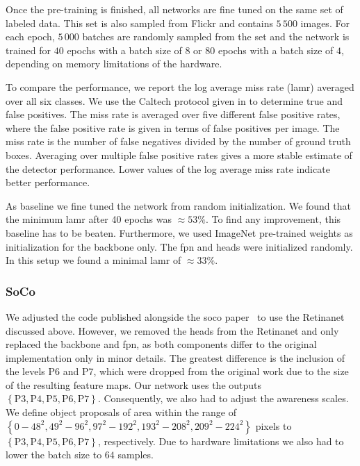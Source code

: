 Once the pre-training is finished, all networks are fine tuned on the same set of labeled data. This set is also sampled from Flickr and contains $5\,500$ images. For each epoch, $5\,000$ batches are randomly sampled from the set and the network is trained for $40$ epochs with a batch size of $8$ or $80$ epochs with a batch size of $4$, depending on memory limitations of the hardware.

To compare the performance, we report the log average miss rate (\acrshort{lamr}) averaged over all six classes. We use the Caltech protocol given in \cite{Dollar:2012aaa} to determine true and false positives. The miss rate is averaged over five different false positive rates, where the false positive rate is given in terms of false positives per image. The miss rate is the number of false negatives divided by the number of ground truth boxes. Averaging over multiple false positive rates gives a more stable estimate of the detector performance. Lower values of the log average miss rate indicate better performance.

As baseline we fine tuned the network from random initialization. We found that the minimum \acrshort{lamr} after 40 epochs was $\approx 53\%$. To find any improvement, this baseline has to be beaten. Furthermore, we used ImageNet pre-trained weights as initialization for the backbone only. The \acrshort{fpn} and heads were initialized randomly. In this setup we found a minimal \acrshort{lamr} of $\approx 33\%$.

\subsubsection{SoCo}
We adjusted the code published alongside the \acrshort{soco} paper~\cite{Wei:2022aaa} to use the Retinanet discussed above. However, we removed the heads from the Retinanet and only replaced the backbone and \acrshort{fpn}, as both components differ to the original implementation only in minor details. The greatest difference is the inclusion of the levels P6 and P7, which were dropped from the original work due to the size of the resulting feature maps. Our network uses the outputs $\left\{\text{P3}, \text{P4}, \text{P5}, \text{P6}, \text{P7}\right\}$. Consequently, we also had to adjust the awareness scales. We define object proposals of area within the range of $\left\{0-48^2,49^2-96^2,97^2-192^2,193^2-208^2,209^2-224^2\right\}$ pixels to $\left\{\text{P3}, \text{P4}, \text{P5}, \text{P6}, \text{P7}\right\}$, respectively. Due to hardware limitations we also had to lower the batch size to $64$ samples.


